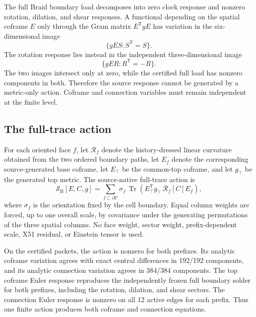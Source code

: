 \documentclass[11pt]{article}
\theoremstyle{definition}
\theoremstyle{remark}
\newcommand{\Tr}{\operatorname{Tr}}
\begin{document}
The full Braid boundary load decomposes into zero clock response and nonzero rotation, dilation, and shear responses. A functional depending on the spatial coframe $E$ only through the Gram matrix $E^{\mathsf T}gE$ has variation in the six-dimensional image
\begin{equation}\label{eq:metricimage}
 \{gES:S^{\mathsf T}=S\}.
\end{equation}
The rotation response lies instead in the independent three-dimensional image
\begin{equation}\label{eq:rotationimage}
 \{gER:R^{\mathsf T}=-R\}.
\end{equation}
The two images intersect only at zero, while the certified full load has nonzero components in both. Therefore the source response cannot be generated by a metric-only action. Coframe and connection variables must remain independent at the finite level.

\subsection{The full-trace action}

For each oriented face $f$, let $\mathcal R_f$ denote the history-dressed linear curvature obtained from the two ordered boundary paths, let $E_f$ denote the corresponding source-generated base coframe, let $E_\top$ be the common-top coframe, and let $g_\top$ be the generated top metric. The source-native full-trace action is
\begin{equation}\label{eq:fullaction}
 \mathcal S_{\mathrm{B}}[E,C,g]
 =\sum_{f\subset\partial\mathcal C}
 \sigma_f\,\Tr\!\left(E_\top^{\mathsf T}g_\top\,\mathcal R_f[C]E_f\right),
\end{equation}
where $\sigma_f$ is the orientation fixed by the cell boundary. Equal column weights are forced, up to one overall scale, by covariance under the generating permutations of the three spatial columns. No face weight, sector weight, prefix-dependent scale, X51 residual, or Einstein tensor is used.

On the certified packets, the action is nonzero for both prefixes. Its analytic coframe variation agrees with exact central differences in 192/192 components, and its analytic connection variation agrees in 384/384 components. The top coframe Euler response reproduces the independently frozen full boundary solder for both prefixes, including the rotation, dilation, and shear sectors. The connection Euler response is nonzero on all 12 active edges for each prefix. Thus one finite action produces both coframe and connection equations.
\end{document}
